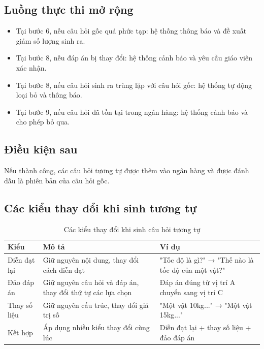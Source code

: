﻿\documentclass[../DoAn.tex]{subfiles}
\begin{document}
\subsection{Luồng thực thi mở rộng}
\begin{itemize}
    \item Tại bước 6, nếu câu hỏi gốc quá phức tạp: hệ thống thông báo và đề xuất giảm số lượng sinh ra.
    \item Tại bước 8, nếu đáp án bị thay đổi: hệ thống cảnh báo và yêu cầu giáo viên xác nhận.
    \item Tại bước 8, nếu câu hỏi sinh ra trùng lặp với câu hỏi gốc: hệ thống tự động loại bỏ và thông báo.
    \item Tại bước 9, nếu câu hỏi đã tồn tại trong ngân hàng: hệ thống cảnh báo và cho phép bỏ qua.
\end{itemize}

\subsection{Điều kiện sau}
Nếu thành công, các câu hỏi tương tự được thêm vào ngân hàng và được đánh dấu là phiên bản của câu hỏi gốc.

\subsection{Các kiểu thay đổi khi sinh tương tự}
\begin{table}[H]
\centering
\begin{tabular}{|p{3cm}|p{5cm}|p{4.5cm}|}
\hline
\textbf{Kiểu} & \textbf{Mô tả} & \textbf{Ví dụ} \\ \hline
Diễn đạt lại & Giữ nguyên nội dung, thay đổi cách diễn đạt & "Tốc độ là gì?" → "Thế nào là tốc độ của một vật?" \\ \hline
Đảo đáp án & Giữ nguyên câu hỏi và đáp án, thay đổi thứ tự các lựa chọn & Đáp án đúng từ vị trí A chuyển sang vị trí C \\ \hline
Thay số liệu & Giữ nguyên cấu trúc, thay đổi giá trị số & "Một vật 10kg..." → "Một vật 15kg..." \\ \hline
Kết hợp & Áp dụng nhiều kiểu thay đổi cùng lúc & Diễn đạt lại + thay số liệu + đảo đáp án \\ \hline
\end{tabular}
\caption{Các kiểu thay đổi khi sinh câu hỏi tương tự}
\label{table:ai_gen_similar_types}
\end{table}
\end{document}
